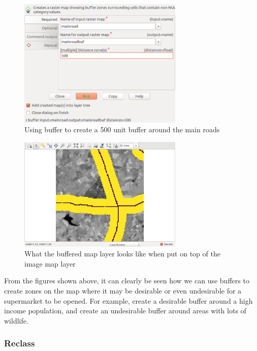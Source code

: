 \documentclass[a4paper,11pt,parskip]{scrartcl}
\begin{document}
\begin{figure}[H]
  \centering
  \includegraphics[width=0.7\textwidth]{pictures/bufferMainRoad.png}
  \caption{Using buffer to create a 500 unit buffer around the main roads}
  \label{fig:bufferMainRoad}
\end{figure}

\begin{figure}[H]
  \centering
  \includegraphics[width=0.7\textwidth]{pictures/bufferMainRoadMap.png}
  \caption{What the buffered map layer looks like when put on top of the image map layer}
  \label{fig:bufferMainRoadMap}
\end{figure}

From the figures shown above, it can clearly be seen how we can use buffers to create zones on the map
where it may be desirable or even undesirable for a supermarket to be opened. For example, create a
desirable buffer around a high income population, and create an undesirable buffer around areas with
lots of wildlife.

\subsubsection{Reclass}
\end{document}

